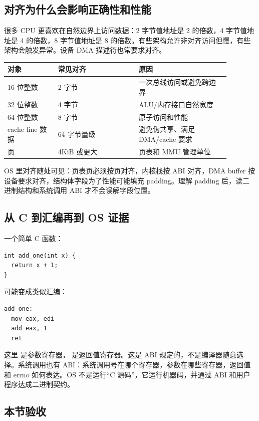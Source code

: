 \subsection{对齐为什么会影响正确性和性能}

很多 CPU 更喜欢在自然边界上访问数据：2 字节值地址是 2 的倍数，4 字节值地址是 4 的倍数，8 字节值地址是 8 的倍数。有些架构允许非对齐访问但慢，有些架构会触发异常。设备 DMA 描述符也常要求对齐。

\begin{longtable}{p{0.2\linewidth}p{0.32\linewidth}p{0.36\linewidth}}
\toprule
对象 & 常见对齐 & 原因 \\
\midrule
16 位整数 & 2 字节 & 一次总线访问或避免跨边界 \\
32 位整数 & 4 字节 & ALU/内存接口自然宽度 \\
64 位整数 & 8 字节 & 原子访问和性能 \\
cache line 数据 & 64 字节量级 & 避免伪共享、满足 DMA/cache 要求 \\
页 & 4KiB 或更大 & 页表和 MMU 管理单位 \\
\bottomrule
\end{longtable}

OS 里对齐随处可见：页表页必须按页对齐，内核栈按 ABI 对齐，DMA buffer 按设备要求对齐，结构体字段为了性能可能填充 padding。理解 padding 后，读二进制结构和系统调用 ABI 才不会误解字段位置。

\subsection{从 C 到汇编再到 OS 证据}

一个简单 C 函数：

\begin{lstlisting}
int add_one(int x) {
  return x + 1;
}
\end{lstlisting}

可能变成类似汇编：

\begin{lstlisting}
add_one:
  mov eax, edi
  add eax, 1
  ret
\end{lstlisting}

这里  是参数寄存器， 是返回值寄存器。这是 ABI 规定的，不是编译器随意选择。系统调用也有 ABI：系统调用号在哪个寄存器，参数在哪些寄存器，返回值和 errno 如何表达。OS 不是运行“C 源码”，它运行机器码，并通过 ABI 和用户程序达成二进制契约。

\subsection{本节验收}

